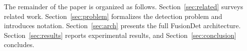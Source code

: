 The remainder of the paper is organized as follows.
Section~\ref{sec:related} surveys related work.
Section~\ref{sec:problem} formalizes the detection problem and
introduces notation. Section~\ref{sec:arch} presents the full
FusionDet architecture. Section~\ref{sec:results} reports
experimental results, and Section~\ref{sec:conclusion} concludes.
